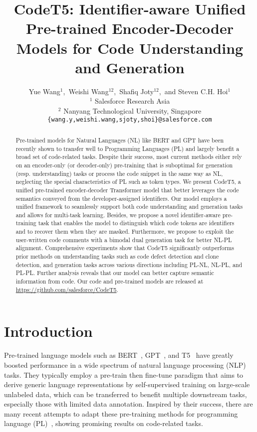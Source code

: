 \documentclass[11pt]{article}
\title{CodeT5: Identifier-aware Unified Pre-trained Encoder-Decoder Models for Code Understanding and Generation}
\author{Yue Wang$^{1}$,~Weishi Wang$^{12}$,~Shafiq Joty$^{12}$,~and Steven C.H. Hoi$^{1}$\\
$^{1}$ Salesforce Research Asia \\
$^{2}$ Nanyang Technological University, Singapore\\
\texttt{\{wang.y,weishi.wang,sjoty,shoi\}@salesforce.com}\\}
\begin{document}
\maketitle
\begin{abstract}
Pre-trained models for Natural Languages (NL) like BERT and GPT have been recently shown to transfer well to Programming Languages (PL) and largely benefit a broad set of code-related tasks. Despite their success, most current methods either rely on an encoder-only (or decoder-only) pre-training that is suboptimal for generation (resp. understanding) tasks or process the code snippet in the same way as NL, neglecting the special characteristics of PL such as token types. We present CodeT5, a unified pre-trained encoder-decoder Transformer model that better leverages the code semantics conveyed from the developer-assigned identifiers. Our model employs a unified framework to seamlessly support both code understanding and generation tasks and allows for multi-task learning. Besides, we propose a novel identifier-aware pre-training task that enables the model to distinguish which code tokens are identifiers and to recover them when they are masked. Furthermore, we propose to exploit the user-written code comments with a bimodal dual generation task for better NL-PL alignment.
Comprehensive experiments show that CodeT5 significantly outperforms prior methods on understanding tasks such as code defect detection and clone detection, and generation tasks across various directions including PL-NL, NL-PL, and PL-PL. Further analysis reveals that our model can better capture semantic information from code.  Our code and pre-trained models are released at \url{https://github.com/salesforce/CodeT5}.
\end{abstract}
 \section{Introduction}
Pre-trained language models such as 
BERT~\cite{DBLP:conf/naacl/DevlinCLT19}, GPT~\cite{radford2019language}, and T5~\cite{DBLP:journals/jmlr/RaffelSRLNMZLL20} have greatly boosted  performance  in a wide spectrum of natural language processing (NLP) tasks. They typically employ a pre-train then fine-tune paradigm that aims to derive generic language representations by self-supervised training on large-scale unlabeled data, which can be transferred to benefit multiple downstream tasks, especially those with limited data annotation.
Inspired by their success, there are many recent attempts to adapt these pre-training methods for programming language (PL)~\cite{DBLP:conf/sigsoft/SvyatkovskiyDFS20,DBLP:conf/icml/KanadeMBS20,DBLP:conf/emnlp/FengGTDFGS0LJZ20}, showing promising results on  code-related tasks.
\end{document}

